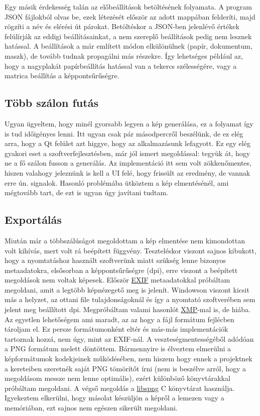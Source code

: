 Egy másik érdekesség talán az előbeállítások betöltésének folyamata. A program JSON fájlokból olvas be, ezek létezését először az adott mappában felderíti, majd rögzíti a név és elérési út párokat. Betöltéskor a JSON-ben jelenlévő értékek felülírják az eddigi beállításainkat, a nem szereplő beállítások pedig nem lesznek hatással. A beállítások a már említett módon elkülönülnek (papír, dokumentum, maszk), de tovább tudnak propagálni más részekre. Így lehetséges például az, hogy a nagyplakát papírbeállítás hatással van a tekercs szélességére, vagy a matrica beállítás a képpontsűrűségre. 

\subsection{Több szálon futás}

Ugyan ügyeltem, hogy minél gyorsabb legyen a kép generálása, ez a folyamat így is tud időigényes lenni. Itt ugyan csak pár másodpercről beszélünk, de ez elég arra, hogy a Qt felület azt higgye, hogy az alkalmazásunk lefagyott. Ez egy elég gyakori eset a szoftverfejlesztésben, már jól ismert megoldással: tegyük át, hogy ne a fő szálon fusson a generálás. Az implementáció itt sem volt zökkenőmentes, hiszen valahogy jeleznünk is kell a UI felé, hogy frissült az eredmény, de vannak erre ún. signalok. Hasonló problémába ütköztem a kép elmentésénél, ami mégtovább tart, de ezt is ugyan úgy javítani tudtam. 

\subsection{Exportálás}

Miután már a többszálúságot megoldottam a kép elmentése nem kimondottan volt kihívás, mert volt rá beépített függvény. Teszteléskor viszont sajnos kibukott, hogy a nyomtatáshoz használt szoftverünk miatt szükség lenne bizonyos metaadatokra, elsősorban a képpontsűrűségre (dpi), erre viszont a beépített megoldások nem voltak képesek. Először \href{https://en.wikipedia.org/wiki/Exif}{EXIF} metaadatokkal próbáltam megoldani, amit a legtöbb képnézegető meg is jelenít. Windowson viszont kicsit más a helyzet, az ottani file tulajdonságoknál és így a nyomtató szoftverében sem jelent meg beállított dpi. Megpróbáltam valami hasonlót \href{https://en.wikipedia.org/wiki/Extensible_Metadata_Platform}{XMP}-mal is, de hiába. Az egyetlen lehetőségem ami maradt, az az hogy a fájl formátum fejlécben tároljam el. Ez persze formátumonként eltér és más-más implementációk tartoznak hozzá, nem úgy, mint az EXIF-nál. A veszteségmentességéből adódóan a PNG formátum melett döntöttem. Bármennyire is élveztem elmerülni a képformátumok kodekjeinek működésében, nem hiszem hogy ennek a projektnek a kereteiben szeretnék saját PNG tömörítőt írni (nem is beszélve arról, hogy a megoldásom messze nem lenne optimális), ezért különböző könyvtárakkal próbáltam megoldani. A végső megoldás a \href{https://libspng.org/}{libspng} C könyvtárat használja. Igyekeztem elkerülni, hogy másolat készüljön a képről a lemezen vagy a memóriában, ezt sajnos nem egészen sikerült megoldani. 

